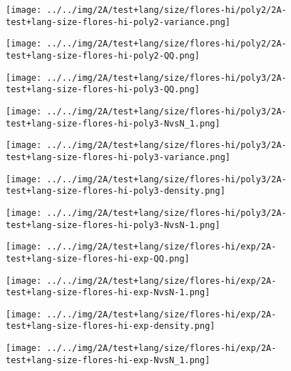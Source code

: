 \begin{figure}[H]
\centering	\texttt{[image: ../../img/2A/test+lang/size/flores-hi/poly2/2A-test+lang-size-flores-hi-poly2-variance.png]}
\end{figure}
\begin{figure}[H]
\centering	\texttt{[image: ../../img/2A/test+lang/size/flores-hi/poly2/2A-test+lang-size-flores-hi-poly2-QQ.png]}
\end{figure}
\begin{figure}[H]
\centering	\texttt{[image: ../../img/2A/test+lang/size/flores-hi/poly3/2A-test+lang-size-flores-hi-poly3-QQ.png]}
\end{figure}
\begin{figure}[H]
\centering	\texttt{[image: ../../img/2A/test+lang/size/flores-hi/poly3/2A-test+lang-size-flores-hi-poly3-NvsN\_1.png]}
\end{figure}
\begin{figure}[H]
\centering	\texttt{[image: ../../img/2A/test+lang/size/flores-hi/poly3/2A-test+lang-size-flores-hi-poly3-variance.png]}
\end{figure}
\begin{figure}[H]
\centering	\texttt{[image: ../../img/2A/test+lang/size/flores-hi/poly3/2A-test+lang-size-flores-hi-poly3-density.png]}
\end{figure}
\begin{figure}[H]
\centering	\texttt{[image: ../../img/2A/test+lang/size/flores-hi/poly3/2A-test+lang-size-flores-hi-poly3-NvsN-1.png]}
\end{figure}
\begin{figure}[H]
\centering	\texttt{[image: ../../img/2A/test+lang/size/flores-hi/exp/2A-test+lang-size-flores-hi-exp-QQ.png]}
\end{figure}
\begin{figure}[H]
\centering	\texttt{[image: ../../img/2A/test+lang/size/flores-hi/exp/2A-test+lang-size-flores-hi-exp-NvsN-1.png]}
\end{figure}
\begin{figure}[H]
\centering	\texttt{[image: ../../img/2A/test+lang/size/flores-hi/exp/2A-test+lang-size-flores-hi-exp-density.png]}
\end{figure}
\begin{figure}[H]
\centering	\texttt{[image: ../../img/2A/test+lang/size/flores-hi/exp/2A-test+lang-size-flores-hi-exp-NvsN\_1.png]}
\end{figure}
